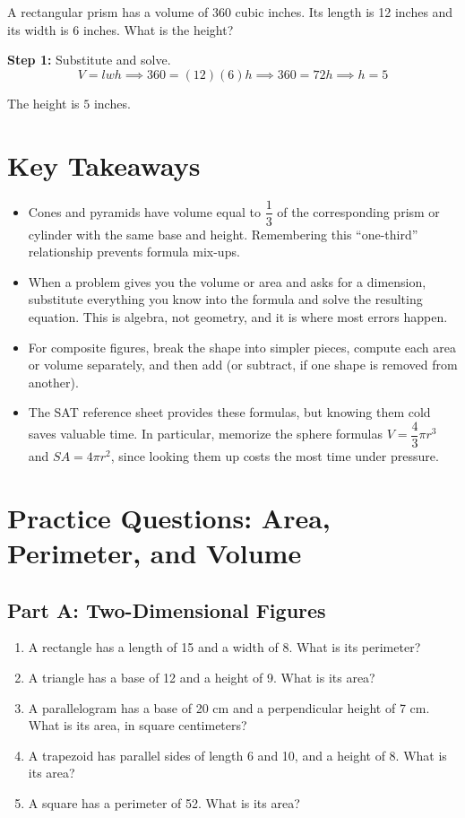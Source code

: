 \documentclass[14pt]{extarticle}
\begin{document}
A rectangular prism has a volume of 360 cubic inches. Its length is 12 inches and its width is 6 inches. What is the height?

\textbf{Step 1:} Substitute and solve.
\[
V = lwh \implies 360 = (12)(6)h \implies 360 = 72h \implies h = 5
\]

The height is \(\boxed{5}\) inches.

\section*{Key Takeaways}
\begin{itemize}
  \item Cones and pyramids have volume equal to \(\dfrac{1}{3}\) of the corresponding prism or cylinder with the same base and height. Remembering this ``one-third'' relationship prevents formula mix-ups.
  \item When a problem gives you the volume or area and asks for a dimension, substitute everything you know into the formula and solve the resulting equation. This is algebra, not geometry, and it is where most errors happen.
  \item For composite figures, break the shape into simpler pieces, compute each area or volume separately, and then add (or subtract, if one shape is removed from another).
  \item The SAT reference sheet provides these formulas, but knowing them cold saves valuable time. In particular, memorize the sphere formulas \(V = \dfrac{4}{3}\pi r^3\) and \(SA = 4\pi r^2\), since looking them up costs the most time under pressure.
\end{itemize}

\newpage

\section*{Practice Questions: Area, Perimeter, and Volume}

\subsection*{Part A: Two-Dimensional Figures}
\begin{enumerate}
  \item A rectangle has a length of 15 and a width of 8. What is its perimeter?
  \item A triangle has a base of 12 and a height of 9. What is its area?
  \item A parallelogram has a base of 20 cm and a perpendicular height of 7 cm. What is its area, in square centimeters?
  \item A trapezoid has parallel sides of length 6 and 10, and a height of 8. What is its area?
  \item A square has a perimeter of 52. What is its area?
\end{enumerate}
\end{document}
